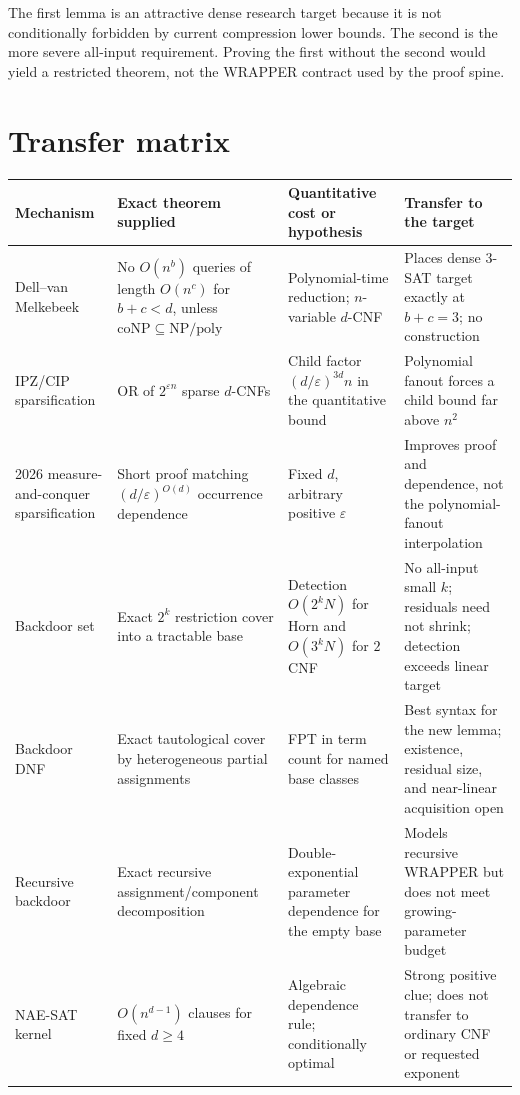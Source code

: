 \documentclass[11pt]{article}
\begin{document}
The first lemma is an attractive dense research target because it is not
conditionally forbidden by current compression lower bounds.  The second is
the more severe all-input requirement.  Proving the first without the second
would yield a restricted theorem, not the WRAPPER contract used by the proof
spine.

\section{Transfer matrix}

\renewcommand{\arraystretch}{1.23}
\begin{longtable}{@{}p{}p{}p{}p{}@{}}
\toprule
Mechanism & Exact theorem supplied & Quantitative cost or hypothesis & Transfer to the target \\
\midrule
\endhead
Dell--van Melkebeek & No $O(n^b)$ queries of length $O(n^c)$ for $b+c<d$, unless $\mathrm{coNP}\subseteq\mathrm{NP/poly}$ & Polynomial-time reduction; $n$-variable $d$-CNF & Places dense $3$-SAT target exactly at $b+c=3$; no construction \\
IPZ/CIP sparsification & OR of $2^{\varepsilon n}$ sparse $d$-CNFs & Child factor $(d/\varepsilon)^{3d}n$ in the quantitative bound & Polynomial fanout forces a child bound far above $n^2$ \\
2026 measure-and-conquer sparsification & Short proof matching $(d/\varepsilon)^{O(d)}$ occurrence dependence & Fixed $d$, arbitrary positive $\varepsilon$ & Improves proof and dependence, not the polynomial-fanout interpolation \\
Backdoor set & Exact $2^k$ restriction cover into a tractable base & Detection $O(2^kN)$ for Horn and $O(3^kN)$ for $2$CNF & No all-input small $k$; residuals need not shrink; detection exceeds linear target \\
Backdoor DNF & Exact tautological cover by heterogeneous partial assignments & FPT in term count for named base classes & Best syntax for the new lemma; existence, residual size, and near-linear acquisition open \\
Recursive backdoor & Exact recursive assignment/component decomposition & Double-exponential parameter dependence for the empty base & Models recursive WRAPPER but does not meet growing-parameter budget \\
NAE-SAT kernel & $O(n^{d-1})$ clauses for fixed $d\ge4$ & Algebraic dependence rule; conditionally optimal & Strong positive clue; does not transfer to ordinary CNF or requested exponent \\

\end{longtable}
\end{document}
